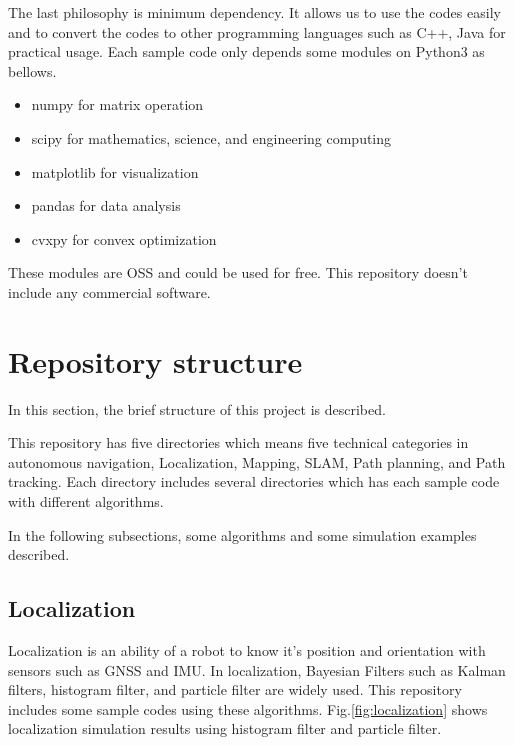 \documentclass{bmvc2k}
\begin{document}
The last philosophy is minimum dependency.
It allows us to use the codes easily and to convert the codes to other programming languages such as C++, Java for practical usage.
Each sample code only depends some modules on Python3 as bellows.

\begin{itemize}
 \item numpy\cite{numpy} for matrix operation
 \item scipy\cite{scipy} for mathematics, science, and engineering computing
 \item matplotlib\cite{matplotlib} for visualization
 \item pandas\cite{pandas} for data analysis
 \item cvxpy\cite{cvxpy} for convex optimization
\end{itemize}

These modules are OSS and could be used for free. This repository doesn't include any commercial software.


\section{Repository structure}

In this section, the brief structure of this project is described.

This repository has five directories which means five technical categories in autonomous navigation, Localization, Mapping, SLAM, Path planning, and Path tracking. Each directory includes several directories which has each sample code with different algorithms.

In the following subsections, some algorithms and some simulation examples described.

\subsection{Localization}

Localization is an ability of a robot to know it's position and orientation with sensors such as GNSS and IMU.
In localization, Bayesian Filters such as Kalman filters, histogram filter, and particle filter are widely used\cite{PR}.
This repository includes some sample codes using these algorithms.
Fig.\ref{fig:localization} shows localization simulation results using histogram filter and particle filter.
\end{document}
